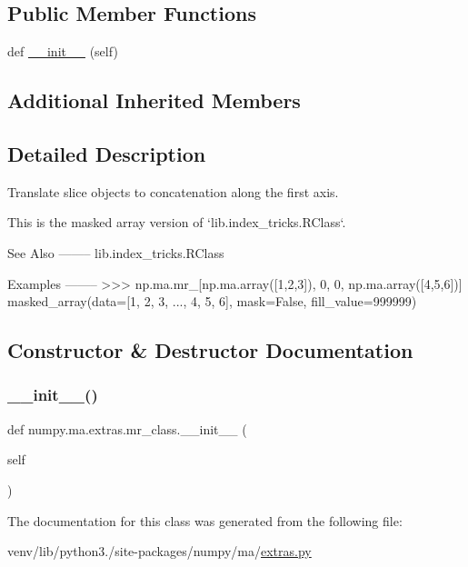 \subsection*{Public Member Functions}
\begin{DoxyCompactItemize}
\item 
def \hyperlink{classnumpy_1_1ma_1_1extras_1_1mr__class_a4fa1ac3ac846eac4cc4e17402e38e042}{\+\_\+\+\_\+init\+\_\+\+\_\+} (self)
\end{DoxyCompactItemize}
\subsection*{Additional Inherited Members}


\subsection{Detailed Description}
\begin{DoxyVerb}Translate slice objects to concatenation along the first axis.

This is the masked array version of `lib.index_tricks.RClass`.

See Also
--------
lib.index_tricks.RClass

Examples
--------
>>> np.ma.mr_[np.ma.array([1,2,3]), 0, 0, np.ma.array([4,5,6])]
masked_array(data=[1, 2, 3, ..., 4, 5, 6],
             mask=False,
       fill_value=999999)\end{DoxyVerb}
 

\subsection{Constructor \& Destructor Documentation}
\mbox{\label{classnumpy_1_1ma_1_1extras_1_1mr__class_a4fa1ac3ac846eac4cc4e17402e38e042}} 
\subsubsection{\texorpdfstring{\+\_\+\+\_\+init\+\_\+\+\_\+()}{\_\_init\_\_()}}
{\footnotesize\ttfamily def numpy.\+ma.\+extras.\+mr\+\_\+class.\+\_\+\+\_\+init\+\_\+\+\_\+ (\begin{DoxyParamCaption}\item[{}]{self }\end{DoxyParamCaption})}



The documentation for this class was generated from the following file\+:\begin{DoxyCompactItemize}
\item 
venv/lib/python3./site-\/packages/numpy/ma/\hyperlink{extras_8py}{extras.\+py}\end{DoxyCompactItemize}
